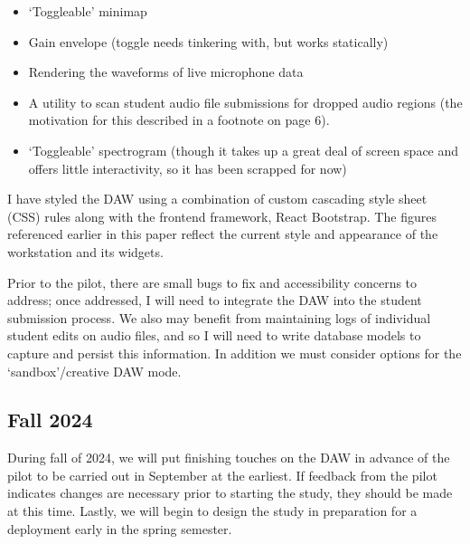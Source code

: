 \documentclass[manuscript,screen,review]{acmart}
\begin{document}
\begin{itemize}
    \item `Toggleable' minimap
    \item Gain envelope (toggle needs tinkering with, but works statically)
    \item Rendering the waveforms of live microphone data
    \item A utility to scan student audio file submissions for dropped audio regions (the motivation for this described in a footnote on page 6).
    \item `Toggleable' spectrogram (though it takes up a great deal of screen space and offers little interactivity, so it has been scrapped for now)
\end{itemize}

I have styled the DAW using a combination of custom cascading style sheet (CSS) rules along with the frontend framework, React Bootstrap.
The figures referenced earlier in this paper reflect the current style and appearance of the workstation and its widgets.

Prior to the pilot, there are small bugs to fix and accessibility concerns to address; once addressed, I will need to integrate the DAW into the student submission process.
We also may benefit from maintaining logs of individual student edits on audio files, and so I will need to write database models to capture and persist this information.
In addition we must consider options for the `sandbox'/creative DAW mode.



\newpage

\subsection{Fall 2024}
During fall of 2024, we will put finishing touches on the DAW in advance of the pilot to be carried out in September at the earliest. If feedback from the pilot indicates changes are necessary prior to starting the study, they should be made at this time. Lastly, we will begin to design the study in preparation for a deployment early in the spring semester. 
\end{document}

